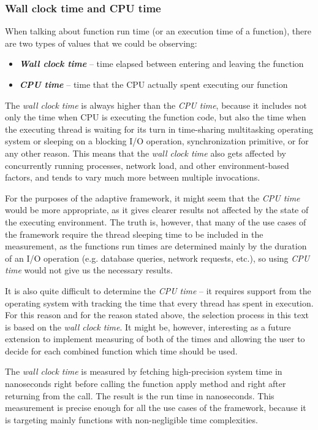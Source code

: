 \subsubsection{Wall clock time and CPU time}

When talking about function run time (or an execution time of a function), there are two types of values that we could be observing:

\begin{itemize}
	\item \textbf{\textit{Wall clock time}} -- time elapsed between entering and leaving the function
	\item \textbf{\textit{CPU time}} -- time that the CPU actually spent executing our function
\end{itemize}

The \textit{wall clock time} is always higher than the \textit{CPU time}, because it includes not only the time when CPU is executing the function code, but also the time when the executing thread is waiting for its turn in time-sharing multitasking operating system or sleeping on a blocking I/O operation, synchronization primitive, or for any other reason. This means that the \textit{wall clock time} also gets affected by concurrently running processes, network load, and other environment-based factors, and tends to vary much more between multiple invocations.

For the purposes of the adaptive framework, it might seem that the \textit{CPU time} would be more appropriate, as it gives clearer results not affected by the state of the executing environment. The truth is, however, that many of the use cases of the framework require the thread sleeping time to be included in the measurement, as the functions run times are determined mainly by the duration of an I/O operation (e.g. database queries, network requests, etc.), so using \textit{CPU time} would not give us the necessary results.

It is also quite difficult to determine the \textit{CPU time} -- it requires support from the operating system with tracking the time that every thread has spent in execution. For this reason and for the reason stated above, the selection process in this text is based on the \textit{wall clock time}. It might be, however, interesting as a future extension to implement measuring of both of the times and allowing the user to decide for each combined function which time should be used.

The \textit{wall clock time} is measured by fetching high-precision system time in nanoseconds right before calling the function apply method and right after returning from the call. The result is the run time in nanoseconds. This measurement is precise enough for all the use cases of the framework, because it is targeting mainly functions with non-negligible time complexities.

